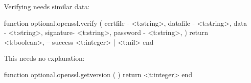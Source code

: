 Verifying needs similar data:

\starttyping[option=LUA]
function optional.openssl.verify (
    {
        certfile - <t:string>,
        datafile - <t:string>,
        data     - <t:string>,
        signature- <t:string>,
        password - <t:string>,
    }
)
    return
        <t:boolean>, -- success
        <t:integer> | <t:nil>
end
\stoptyping

This needs no explanation:

\starttyping[option=LUA]
function optional.openssl.getversion ( )
    return <t:integer>
end
\stoptyping

\stopsubsubsubject

\stopsubsection

\stopsection

\stopdocument

%
